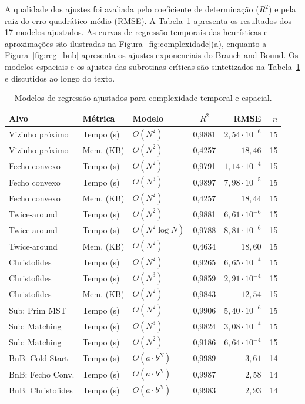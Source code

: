A qualidade dos ajustes foi avaliada pelo coeficiente de determinação ($R^2$) e pela raiz do erro quadrático médio (RMSE). A Tabela~\ref{tab:reg} apresenta os resultados dos 17 modelos ajustados. As curvas de regressão temporais das heurísticas e aproximações são ilustradas na Figura~\ref{fig:complexidade}(a), enquanto a Figura~\ref{fig:reg_bnb} apresenta os ajustes exponenciais do Branch-and-Bound. Os modelos espaciais e os ajustes das subrotinas críticas são sintetizados na Tabela~\ref{tab:reg} e discutidos ao longo do texto.

\begin{table}[ht]
\centering
\caption{Modelos de regressão ajustados para complexidade temporal e espacial.}
\label{tab:reg}
\small
\begin{tabular}{lllcrr}
\toprule
Alvo & Métrica & Modelo & $R^2$ & RMSE & $n$ \\
\midrule
Vizinho próximo & Tempo (s) & $O(N^2)$ & 0,9881 & $2,54\cdot10^{-6}$ & 15 \\
Vizinho próximo & Mem. (KB) & $O(N^2)$ & 0,4257 & $18,46$ & 15 \\
Fecho convexo & Tempo (s) & $O(N^2)$ & 0,9791 & $1,14\cdot10^{-4}$ & 15 \\
Fecho convexo & Tempo (s) & $O(N^3)$ & 0,9897 & $7,98\cdot10^{-5}$ & 15 \\
Fecho convexo & Mem. (KB) & $O(N^2)$ & 0,4257 & $18,44$ & 15 \\
Twice-around & Tempo (s) & $O(N^2)$ & 0,9881 & $6,61\cdot10^{-6}$ & 15 \\
Twice-around & Tempo (s) & $O(N^2\log N)$ & 0,9788 & $8,81\cdot10^{-6}$ & 15 \\
Twice-around & Mem. (KB) & $O(N^2)$ & 0,4634 & $18,60$ & 15 \\
Christofides & Tempo (s) & $O(N^2)$ & 0,9265 & $6,65\cdot10^{-4}$ & 15 \\
Christofides & Tempo (s) & $O(N^3)$ & 0,9859 & $2,91\cdot10^{-4}$ & 15 \\
Christofides & Mem. (KB) & $O(N^2)$ & 0,9843 & $12,54$ & 15 \\
Sub: Prim MST & Tempo (s) & $O(N^2)$ & 0,9906 & $5,40\cdot10^{-6}$ & 15 \\
Sub: Matching & Tempo (s) & $O(N^3)$ & 0,9824 & $3,08\cdot10^{-4}$ & 15 \\
Sub: Matching & Tempo (s) & $O(N^2)$ & 0,9186 & $6,64\cdot10^{-4}$ & 15 \\
BnB: Cold Start & Tempo (s) & $O(a\cdot b^N)$ & 0,9989 & $3,61$ & 14 \\
BnB: Fecho Conv. & Tempo (s) & $O(a\cdot b^N)$ & 0,9987 & $2,58$ & 14 \\
BnB: Christofides & Tempo (s) & $O(a\cdot b^N)$ & 0,9983 & $2,93$ & 14 \\
\bottomrule
\end{tabular}
\end{table}


